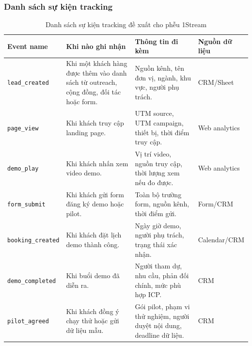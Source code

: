 \subsubsection{Danh sách sự kiện tracking}


\begin{table}[H]
    \centering
    \footnotesize
    \setlength{\tabcolsep}{3pt}
    \renewcommand{\arraystretch}{1.18}
    \caption{Danh sách sự kiện tracking đề xuất cho phễu 1Stream}
    \label{tab:tracking-events-1stream}
    \begin{tabularx}{\linewidth}{@{}L{3.2cm}Y Y L{2.4cm}@{}}
        \toprule
        \textbf{Event name} &
        \textbf{Khi nào ghi nhận} &
        \textbf{Thông tin đi kèm} &
        \textbf{Nguồn dữ liệu} \\ \midrule

        \texttt{lead\_created} &
        Khi một khách hàng được thêm vào danh sách từ outreach, cộng đồng, đối
        tác hoặc form. &
        Nguồn kênh, tên đơn vị, ngành, khu vực, người phụ trách. &
        CRM/Sheet \\

        \texttt{page\_view} &
        Khi khách truy cập landing page. &
        UTM source, UTM campaign, thiết bị, thời điểm truy cập. &
        Web analytics \\

        \texttt{demo\_play} &
        Khi khách nhấn xem video demo. &
        Vị trí video, nguồn truy cập, thời lượng xem nếu đo được. &
        Web analytics \\

        \texttt{form\_submit} &
        Khi khách gửi form đăng ký demo hoặc pilot. &
        Toàn bộ trường form, nguồn kênh, thời điểm gửi. &
        Form/CRM \\

        \texttt{booking\_created} &
        Khi khách đặt lịch demo thành công. &
        Ngày giờ demo, người phụ trách, trạng thái xác nhận. &
        Calendar/CRM \\

        \texttt{demo\_completed} &
        Khi buổi demo đã diễn ra. &
        Người tham dự, nhu cầu, phản đối chính, mức phù hợp ICP. &
        CRM \\

        \texttt{pilot\_agreed} &
        Khi khách đồng ý chạy thử hoặc gửi dữ liệu mẫu. &
        Gói pilot, phạm vi thử nghiệm, người duyệt nội dung, deadline dữ liệu. &
        CRM \\


\end{tabularx}
\end{table}
